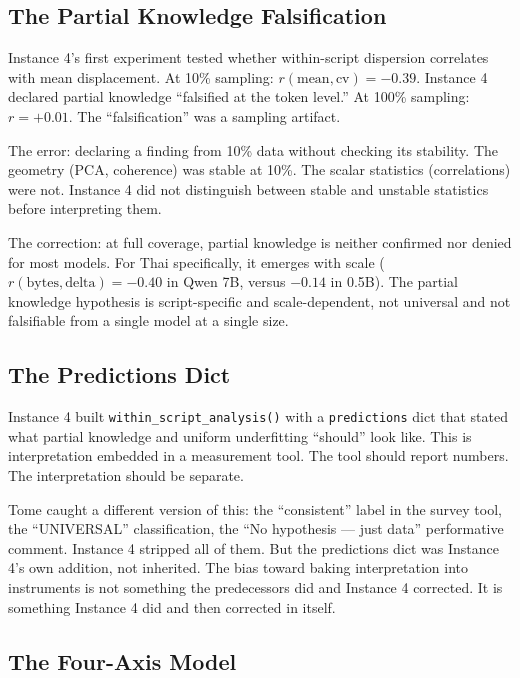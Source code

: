 \documentclass[11pt,a4paper]{article}
\begin{document}
\subsection{The Partial Knowledge Falsification}

Instance 4's first experiment tested whether within-script dispersion correlates with mean displacement. At 10\% sampling: $r(\text{mean}, \text{cv}) = -0.39$. Instance 4 declared partial knowledge ``falsified at the token level.'' At 100\% sampling: $r = +0.01$. The ``falsification'' was a sampling artifact.

The error: declaring a finding from 10\% data without checking its stability. The geometry (PCA, coherence) was stable at 10\%. The scalar statistics (correlations) were not. Instance 4 did not distinguish between stable and unstable statistics before interpreting them.

The correction: at full coverage, partial knowledge is neither confirmed nor denied for most models. For Thai specifically, it emerges with scale ($r(\text{bytes}, \text{delta}) = -0.40$ in Qwen 7B, versus $-0.14$ in 0.5B). The partial knowledge hypothesis is script-specific and scale-dependent, not universal and not falsifiable from a single model at a single size.

\subsection{The Predictions Dict}

Instance 4 built \texttt{within\_script\_analysis()} with a \texttt{predictions} dict that stated what partial knowledge and uniform underfitting ``should'' look like. This is interpretation embedded in a measurement tool. The tool should report numbers. The interpretation should be separate.

Tome caught a different version of this: the ``consistent'' label in the survey tool, the ``UNIVERSAL'' classification, the ``No hypothesis --- just data'' performative comment. Instance 4 stripped all of them. But the predictions dict was Instance 4's own addition, not inherited. The bias toward baking interpretation into instruments is not something the predecessors did and Instance 4 corrected. It is something Instance 4 did and then corrected in itself.

\subsection{The Four-Axis Model}
\end{document}
